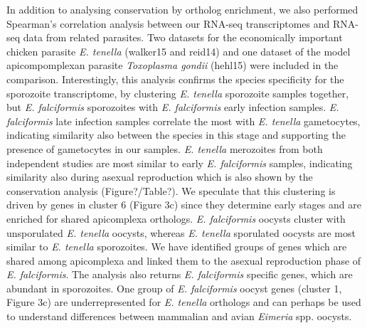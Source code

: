 \documentclass{bmcart}
\begin{document}
In addition to analysing conservation by ortholog enrichment, we also performed Spearman's correlation analysis between our RNA-seq transcriptomes and RNA-seq data from related parasites. Two datasets for the economically important chicken parasite \textit{E. tenella} (walker15 and reid14) and one dataset of the model apicompomplexan parasite \textit{Toxoplasma gondii} (hehl15) were included in the comparison. Interestingly, this analysis confirms the species specificity for the sporozoite transcriptome, by clustering \textit{E. tenella} sporozoite samples together, but \textit{E. falciformis} sporozoites with \textit{E. falciformis} early infection samples. \textit{E. falciformis} late infection samples correlate the most with \textit{E. tenella} gametocytes, indicating similarity also between the species in this stage and supporting the presence of gametocytes in our samples. \textit{E. tenella} merozoites from both independent studies are most similar to early \textit{E. falciformis} samples, indicating similarity also during asexual reproduction which is also shown by the conservation analysis (Figure?/Table?). We speculate that this clustering is driven by genes in cluster 6 (Figure 3c) since they determine early stages and are enriched for shared apicomplexa orthologs. \textit{E. falciformis} oocysts cluster with unsporulated \textit{E. tenella} oocysts, whereas \textit{E. tenella} sporulated oocysts are most similar to \textit{E. tenella} sporozoites. We have identified groups of genes which are shared among apicomplexa and linked them to the asexual reproduction phase of \textit{E. falciformis}. The analysis also returns \textit{E. falciformis} specific genes, which are abundant in sporozoites. One group of \textit{E. falciformis} oocyst genes (cluster 1, Figure 3c) are underrepresented for \textit{E. tenella} orthologs and can perhaps be used to understand differences between mammalian and avian \textit{Eimeria} spp. oocysts.
\end{document}
